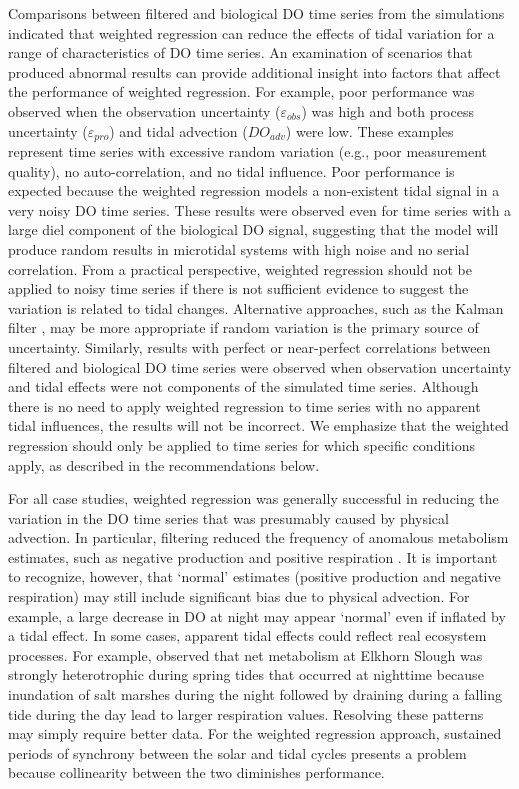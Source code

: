 \documentclass[letterpaper,12pt,oneside]{article}\usepackage[]{graphicx}\usepackage[]{color}
\begin{document}
Comparisons between filtered and biological \ac{DO} time series from the simulations indicated that weighted regression can reduce the effects of tidal variation for a range of characteristics of \ac{DO} time series.  An examination of scenarios that produced abnormal results can provide additional insight into factors that affect the performance of weighted regression.  For example, poor performance was observed when the observation uncertainty ($\varepsilon_{obs}$) was high and both process uncertainty ($\varepsilon_{pro}$) and tidal advection ($DO_{adv}$) were low.  These examples represent time series with excessive random variation (e.g., poor measurement quality), no auto-correlation, and no tidal influence.  Poor performance is expected because the weighted regression models a non-existent tidal signal in a very noisy \ac{DO} time series.  These results were observed even for time series with a large diel component of the biological \ac{DO} signal, suggesting that the model will produce random results in microtidal systems with high noise and no serial correlation.  From a practical perspective, weighted regression should not be applied to noisy time series if there is not sufficient evidence to suggest the variation is related to tidal changes.  Alternative approaches, such as the Kalman filter \citep{Harvey89,Batt12}, may be more appropriate if random variation is the primary source of uncertainty.  Similarly, results with perfect or near-perfect correlations between filtered and biological \ac{DO} time series were observed when observation uncertainty and tidal effects were not components of the simulated time series.  Although there is no need to apply weighted regression to time series with no apparent tidal influences, the results will not be incorrect.  We emphasize that the weighted regression should only be applied to time series for which specific conditions apply, as described in the recommendations below.  

For all case studies, weighted regression was generally successful in reducing the variation in the \ac{DO} time series that was presumably caused by physical advection.  In particular, filtering reduced the frequency of anomalous metabolism estimates, such as negative production and positive respiration \citep{Needoba12}.  It is important to recognize, however, that `normal' estimates (positive production and negative respiration) may still include significant bias due to physical advection.  For example, a large decrease in \ac{DO} at night may appear `normal' even if inflated by a tidal effect.  In some cases, apparent tidal effects could reflect real ecosystem processes. For example, \citet{Nidzieko14} observed that net metabolism at Elkhorn Slough was strongly heterotrophic during spring tides that occurred at nighttime because inundation of salt marshes during the night followed by draining during a falling tide during the day lead to larger respiration values.  Resolving these patterns may simply require better data.  For the weighted regression approach, sustained periods of synchrony between the solar and tidal cycles presents a problem because collinearity between the two diminishes performance. 
\end{document}
